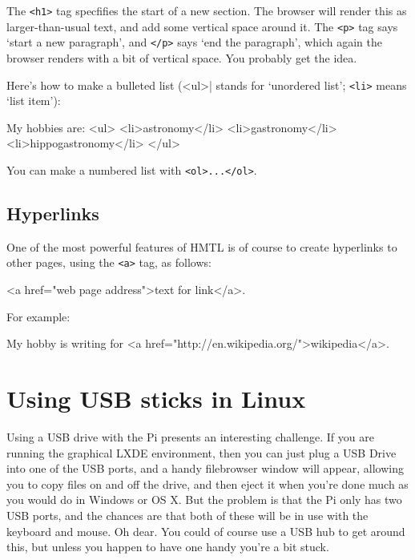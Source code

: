 The \verb|<h1>| tag specfifies the start of a new section. The browser
will render this as larger-than-usual text, and add some vertical
space around it. The \verb|<p>| tag says `start a new paragraph', and
\verb|</p>| says `end the paragraph', which again the browser renders
with a bit of vertical space. You probably get the idea.

Here's how to make a bulleted list (\verb||<ul>| stands for `unordered
list'; \verb|<li>| means `list item'):

\begin{ttoutenv}
My hobbies are:
<ul>
<li>astronomy</li>
<li>gastronomy</li>
<li>hippogastronomy</li>
</ul>
\end{ttoutenv}

You can make a numbered list with \verb|<ol>...</ol>|.

\subsection{Hyperlinks}

One of the most powerful features of HMTL is of course to create hyperlinks to
other pages, using the \verb|<a>| tag, as follows:

\begin{ttoutenv}
<a href="web page address">text for link</a>.
\end{ttoutenv}

For example:

\begin{ttoutenv}
My hobby is writing for <a href="http://en.wikipedia.org/">wikipedia</a>.
\end{ttoutenv}

\section{Using USB sticks in Linux}

Using a USB drive with the Pi presents an interesting challenge. If you are running the graphical LXDE environment, then you can just plug a USB Drive into one of the USB ports, and a handy filebrowser window will appear, allowing you to copy files on and off the drive, and then eject it when you're done much as you would do in Windows or OS X. But the problem is that the Pi only has two USB ports, and the chances are that both of these will be in use with the keyboard and mouse. Oh dear. You could of course use a USB hub to get around this, but unless you happen to have one handy you're a bit stuck. 

